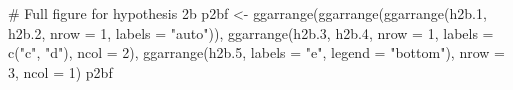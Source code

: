 \documentclass[
  bookmarksnumbered]{article}
\newenvironment{Shaded}{\begin{snugshade}}{\end{snugshade}}
\newcommand{\AttributeTok}[1]{\textcolor[rgb]{0.80,0.80,0.80}{#1}}
\newcommand{\CommentTok}[1]{\textcolor[rgb]{0.50,0.62,0.50}{#1}}
\newcommand{\DecValTok}[1]{\textcolor[rgb]{0.86,0.86,0.80}{#1}}
\newcommand{\FloatTok}[1]{\textcolor[rgb]{0.75,0.75,0.82}{#1}}
\newcommand{\FunctionTok}[1]{\textcolor[rgb]{0.94,0.94,0.56}{#1}}
\newcommand{\NormalTok}[1]{\textcolor[rgb]{0.80,0.80,0.80}{#1}}
\newcommand{\OtherTok}[1]{\textcolor[rgb]{0.94,0.94,0.56}{#1}}
\newcommand{\StringTok}[1]{\textcolor[rgb]{0.80,0.58,0.58}{#1}}
\begin{document}
\begin{Shaded}
\begin{Highlighting}[]
\CommentTok{\# Full figure for hypothesis 2b}
\NormalTok{p2bf }\OtherTok{\textless{}{-}} \FunctionTok{ggarrange}\NormalTok{(}\FunctionTok{ggarrange}\NormalTok{(}\FunctionTok{ggarrange}\NormalTok{(h2b}\FloatTok{.1}\NormalTok{, h2b}\FloatTok{.2}\NormalTok{,}
                                      \AttributeTok{nrow =} \DecValTok{1}\NormalTok{,}
                                      \AttributeTok{labels =} \StringTok{"auto"}\NormalTok{)), }
                  \FunctionTok{ggarrange}\NormalTok{(h2b}\FloatTok{.3}\NormalTok{, h2b}\FloatTok{.4}\NormalTok{,}
                            \AttributeTok{nrow =} \DecValTok{1}\NormalTok{,}
                            \AttributeTok{labels =} \FunctionTok{c}\NormalTok{(}\StringTok{"c"}\NormalTok{, }\StringTok{"d"}\NormalTok{),}
                            \AttributeTok{ncol =} \DecValTok{2}\NormalTok{),}
                  \FunctionTok{ggarrange}\NormalTok{(h2b}\FloatTok{.5}\NormalTok{,}
                            \AttributeTok{labels =} \StringTok{"e"}\NormalTok{,}
                            \AttributeTok{legend =} \StringTok{"bottom"}\NormalTok{),}
                  \AttributeTok{nrow =} \DecValTok{3}\NormalTok{,}
                  \AttributeTok{ncol =} \DecValTok{1}\NormalTok{)}
\NormalTok{p2bf}
\end{Highlighting}
\end{Shaded}
\end{document}
